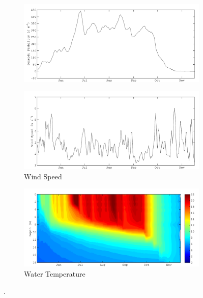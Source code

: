 \begin{figure}
\begin{subfigure}{\lafigsize}
    \includegraphics[width = \linewidth]{figures/Sparkling_St.pdf}
  \end{subfigure}
  \begin{subfigure}{\lafigsize}
    \caption{\label{fig:la:out:wndSpd}Wind Speed}
    \includegraphics[width = \linewidth]{figures/Sparkling_wndSpd.pdf}
  \end{subfigure}
  \begin{subfigure}{\lafigsize}
    \caption{\label{fig:la:out:wTemp}Water Temperature}
    \includegraphics[width = \linewidth]{figures/Sparkling_wTemp.pdf}
  \end{subfigure}
  \caption{\label{fig:la:outputs:2}\lafigdesc.}
\end{figure}

